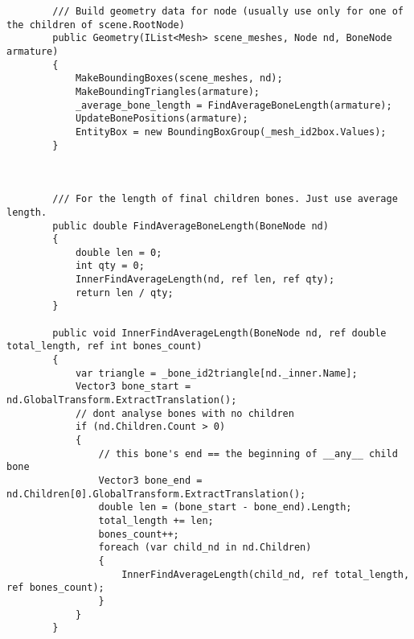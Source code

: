 \begin{scriptsize}
\begin{verbatim}
        /// Build geometry data for node (usually use only for one of the children of scene.RootNode)
        public Geometry(IList<Mesh> scene_meshes, Node nd, BoneNode armature)
        {
            MakeBoundingBoxes(scene_meshes, nd);
            MakeBoundingTriangles(armature);
            _average_bone_length = FindAverageBoneLength(armature);
            UpdateBonePositions(armature);
            EntityBox = new BoundingBoxGroup(_mesh_id2box.Values);
        }
        


        /// For the length of final children bones. Just use average length.
        public double FindAverageBoneLength(BoneNode nd)
        {
            double len = 0;
            int qty = 0;
            InnerFindAverageLength(nd, ref len, ref qty);
            return len / qty;
        }

        public void InnerFindAverageLength(BoneNode nd, ref double total_length, ref int bones_count)
        {
            var triangle = _bone_id2triangle[nd._inner.Name];
            Vector3 bone_start = nd.GlobalTransform.ExtractTranslation();
            // dont analyse bones with no children
            if (nd.Children.Count > 0)
            {
                // this bone's end == the beginning of __any__ child bone
                Vector3 bone_end = nd.Children[0].GlobalTransform.ExtractTranslation();
                double len = (bone_start - bone_end).Length;
                total_length += len;
                bones_count++;
                foreach (var child_nd in nd.Children)
                {
                    InnerFindAverageLength(child_nd, ref total_length, ref bones_count);
                }
            }
        }


\end{verbatim}
\end{scriptsize}
